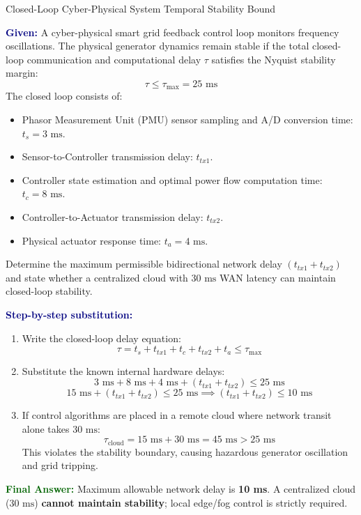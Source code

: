 \documentclass[11pt,a4paper,openany]{report}
\newcommand{\Given}{\par\textbf{\textcolor{navy}{Given:}} }
\newcommand{\Steps}{\par\textbf{\textcolor{navy}{Step-by-step substitution:}}\par}
\newcommand{\Answer}{\par\textbf{\textcolor{darkgreen}{Final Answer:}} }
\begin{document}
\begin{solved}{Closed-Loop Cyber-Physical System Temporal Stability Bound}
\Given A cyber-physical smart grid feedback control loop monitors frequency oscillations. The physical generator dynamics remain stable if the total closed-loop communication and computational delay $\tau$ satisfies the Nyquist stability margin:
\begin{equation}
\tau \le \tau_{\max} = 25\text{ ms}
\end{equation}
The closed loop consists of:
\begin{itemize}[leftmargin=*]
  \item Phasor Measurement Unit (PMU) sensor sampling and A/D conversion time: $t_s = 3\text{ ms}$.
  \item Sensor-to-Controller transmission delay: $t_{tx1}$.
  \item Controller state estimation and optimal power flow computation time: $t_c = 8\text{ ms}$.
  \item Controller-to-Actuator transmission delay: $t_{tx2}$.
  \item Physical actuator response time: $t_a = 4\text{ ms}$.
\end{itemize}
Determine the maximum permissible bidirectional network delay $(t_{tx1} + t_{tx2})$ and state whether a centralized cloud with $30\text{ ms}$ WAN latency can maintain closed-loop stability.
\Steps
\begin{enumerate}[leftmargin=*]
  \item Write the closed-loop delay equation:
  \begin{equation}
  \tau = t_s + t_{tx1} + t_c + t_{tx2} + t_a \le \tau_{\max}
  \end{equation}
  \item Substitute the known internal hardware delays:
  \begin{equation}
  3\text{ ms} + 8\text{ ms} + 4\text{ ms} + (t_{tx1} + t_{tx2}) \le 25\text{ ms}
  \end{equation}
  \begin{equation}
  15\text{ ms} + (t_{tx1} + t_{tx2}) \le 25\text{ ms} \implies (t_{tx1} + t_{tx2}) \le 10\text{ ms}
  \end{equation}
  \item If control algorithms are placed in a remote cloud where network transit alone takes $30\text{ ms}$:
  \begin{equation}
  \tau_{\text{cloud}} = 15\text{ ms} + 30\text{ ms} = 45\text{ ms} > 25\text{ ms}
  \end{equation}
  This violates the stability boundary, causing hazardous generator oscillation and grid tripping.
\end{enumerate}
\Answer Maximum allowable network delay is \textbf{10 ms}. A centralized cloud ($30\text{ ms}$) \textbf{cannot maintain stability}; local edge/fog control is strictly required.
\end{solved}
\end{document}
